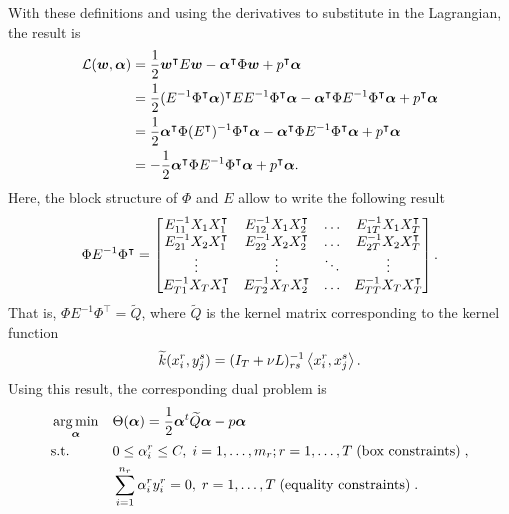 With these definitions and using the derivatives to substitute in the Lagrangian, the result is
\begin{align*}
    \mathcal{L}(\bm{w}, \bm{\alpha}) &= \frac{1}{2} \bm{w}^\intercal E \bm{w} - \bm{\alpha}^\intercal \Phi \bm{w} + p^\intercal \bm{\alpha} \\
    &= \frac{1}{2} (E^{-1} \Phi^\intercal \bm{\alpha})^\intercal E E^{-1} \Phi^\intercal \bm{\alpha} - \bm{\alpha}^\intercal \Phi E^{-1} \Phi^\intercal \bm{\alpha} + p^\intercal \bm{\alpha} \\
    &= \frac{1}{2} \bm{\alpha}^\intercal \Phi ({E^\intercal})^{-1} \Phi^\intercal \bm{\alpha}  - \bm{\alpha}^\intercal \Phi E^{-1} \Phi^\intercal \bm{\alpha} + p^\intercal \bm{\alpha} \\
    &= -\frac{1}{2}  \bm{\alpha}^\intercal \Phi E^{-1} \Phi^\intercal \bm{\alpha} + p^\intercal \bm{\alpha}.
\end{align*}
Here, the block structure of $\Phi$ and $E$ allow to write the following result 
\begin{equation}
    \nonumber
    \Phi E^{-1} \Phi^\intercal = 
    \begin{bmatrix}
        E^{-1}_{11} X_1 X_1^\intercal & E^{-1}_{12} X_1 X_2^\intercal & \ldots & E^{-1}_{1T} X_1 X_T^\intercal \\
        E^{-1}_{21} X_2 X_1^\intercal & E^{-1}_{22} X_2 X_2^\intercal & \ldots & E^{-1}_{2T} X_2 X_T^\intercal \\
        \vdots & \vdots & \ddots & \vdots \\
        E^{-1}_{T1} X_T X_1^\intercal & E^{-1}_{T 2} X_T X_2^\intercal & \ldots & E^{-1}_{T T} X_T X_T^\intercal \\
    \end{bmatrix} .
\end{equation}
That is, $\Phi E^{-1} \Phi^\intercal = \widetilde{Q}$, where $ \widetilde{Q}$ is the kernel matrix corresponding to the kernel function 
\begin{equation}
    \nonumber
    \widetilde{k}(x_i^r, y_j^s) =  (I_T + \nu L)^{-1}_{rs} \left\langle x_i^r, x_j^s \right\rangle.
\end{equation}
Using this result, the corresponding dual problem is
\begin{equation}\label{eq:gl_linear_dual}
    \begin{aligned}
        & \argmin_{\fv{\alpha}} 
        & & \Theta(\fv{\alpha}) = \frac{1}{2} \fv{\alpha}^t \widetilde{Q} \fv{\alpha} - p \fv{\alpha} \\
        & \text{s.t.}
        & & 0 \leq \alpha_i^r \leq C, \;  i=1,\ldots,m_r; r=1,\ldots,T\; \text{(box constraints)} \; , \\
        & & & \sum_{i=1}^{n_r}{\alpha_i^r y_i^r} = 0, \; r=1,\ldots,T\; \text{(equality constraints)} \; .
        \end{aligned}
\end{equation}


